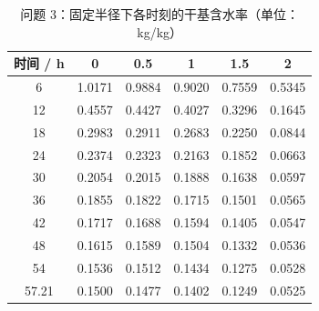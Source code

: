 \begin{table}[htbp]
\centering
\caption{问题 3：固定半径下各时刻的干基含水率（单位：kg/kg）}
\label{table_05_p3_moisture}
\begin{tabular}{cccccc}
\toprule
时间 / h & 0 & 0.5 & 1 & 1.5 & 2 \\
\midrule
6 & 1.0171 & 0.9884 & 0.9020 & 0.7559 & 0.5345 \\
12 & 0.4557 & 0.4427 & 0.4027 & 0.3296 & 0.1645 \\
18 & 0.2983 & 0.2911 & 0.2683 & 0.2250 & 0.0844 \\
24 & 0.2374 & 0.2323 & 0.2163 & 0.1852 & 0.0663 \\
30 & 0.2054 & 0.2015 & 0.1888 & 0.1638 & 0.0597 \\
36 & 0.1855 & 0.1822 & 0.1715 & 0.1501 & 0.0565 \\
42 & 0.1717 & 0.1688 & 0.1594 & 0.1405 & 0.0547 \\
48 & 0.1615 & 0.1589 & 0.1504 & 0.1332 & 0.0536 \\
54 & 0.1536 & 0.1512 & 0.1434 & 0.1275 & 0.0528 \\
57.21 & 0.1500 & 0.1477 & 0.1402 & 0.1249 & 0.0525 \\
\bottomrule
\end{tabular}
\end{table}
